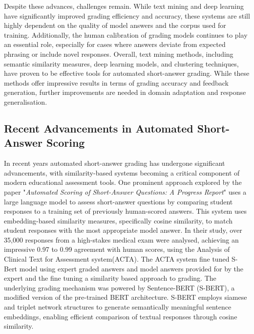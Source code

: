\documentclass[a4paper,10pt]{article}
\begin{document}
Despite these advances, challenges remain. While text mining and deep learning have significantly improved grading efficiency and accuracy, these systems are still highly dependent on the quality of model answers and the corpus used for training. Additionally, the human calibration of grading models continues to play an essential role, especially for cases where answers deviate from expected phrasing or include novel responses. Overall, text mining methods, including semantic similarity measures, deep learning models, and clustering techniques, have proven to be effective tools for automated short-answer grading. While these methods offer impressive results in terms of grading accuracy and feedback generation, further improvements are needed in domain adaptation and response generalisation.\newline\newline

\subsection{Recent Advancements in Automated Short-Answer Scoring}
In recent years automated short-answer grading has undergone significant advancements, with similarity-based systems becoming a critical component of modern educational assessment tools. One prominent approach explored by the paper "\textit{Automated Scoring of Short-Answer Questions: A Progress Report}" uses a large language model to assess short-answer questions by comparing student responses to a training set of previously human-scored answers. This system uses embedding-based similarity measures, specifically cosine similarity, to match student responses with the most appropriate model answer\cite{clauser2024automated}. In their study, over 35,000 responses from a high-stakes medical exam were analysed, achieving an impressive 0.97 to 0.99 agreement with human scores, using the Analysis of Clinical Text for Assessment system(ACTA)\cite{clauser2024automated}. The ACTA system fine tuned S-Bert model using expert graded answers and model answers provided for by the expert and the fine tuning a similarity based approach to grading. The underlying grading mechanism was powered by Sentence-BERT (S-BERT), a modified version of the pre-trained BERT architecture. S-BERT employs siamese and triplet network structures to generate semantically meaningful sentence embeddings, enabling efficient comparison of textual responses through cosine similarity\cite{reimers2019sentencebertsentenceembeddingsusing}.\newline\newline
\end{document}
